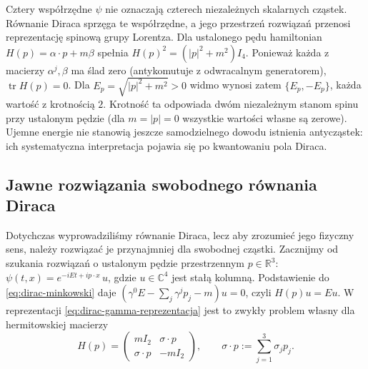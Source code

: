 \begin{uwaga}
Cztery współrzędne $\psi$ nie oznaczają czterech
niezależnych skalarnych cząstek. Równanie Diraca sprzęga
te współrzędne, a jego przestrzeń rozwiązań przenosi
reprezentację spinową grupy Lorentza.
Dla ustalonego pędu hamiltonian $H(p)=\alpha\cdot p+m\beta$
spełnia $H(p)^2=(|p|^2+m^2)I_4$.
Ponieważ każda z macierzy $\alpha^j,\beta$ ma ślad zero
(antykomutuje z odwracalnym generatorem),
$\operatorname{tr}H(p)=0$. Dla
$E_p=\sqrt{|p|^2+m^2}>0$ widmo wynosi zatem
$\{E_p,-E_p\}$, każda wartość z krotnością $2$.
Krotność ta odpowiada dwóm niezależnym stanom spinu
przy ustalonym pędzie (dla $m=|p|=0$ wszystkie
wartości własne są zerowe).
Ujemne energie nie stanowią jeszcze samodzielnego
dowodu istnienia antycząstek: ich systematyczna
interpretacja pojawia się po kwantowaniu pola Diraca.
\end{uwaga}

\subsection{Jawne rozwiązania swobodnego równania Diraca}
\label{subsec:dirac-rozwiazania}

Dotychczas wyprowadziliśmy równanie Diraca, lecz aby zrozumieć
jego fizyczny sens, należy rozwiązać je przynajmniej dla
swobodnej cząstki. Zacznijmy od szukania rozwiązań o ustalonym
pędzie przestrzennym $p\in\mathbb R^3$:
$\psi(t,x)=e^{-iEt+ip\cdot x}\,u$, gdzie $u\in\mathbb C^4$
jest stałą kolumną. Podstawienie do
\eqref{eq:dirac-minkowski} daje
$(\gamma^0E-\sum_j\gamma^jp_j-m)u=0$, czyli
$H(p)u=Eu$. W reprezentacji
\eqref{eq:dirac-gamma-reprezentacja} jest to zwykły problem
własny dla hermitowskiej macierzy
\begin{equation}\label{eq:dirac-hamiltonian-ped}
 H(p)=\begin{pmatrix}
 mI_2&\sigma\cdot p\\
 \sigma\cdot p&-mI_2
 \end{pmatrix},\qquad
 \sigma\cdot p:=\sum_{j=1}^3\sigma_jp_j.
\end{equation}

